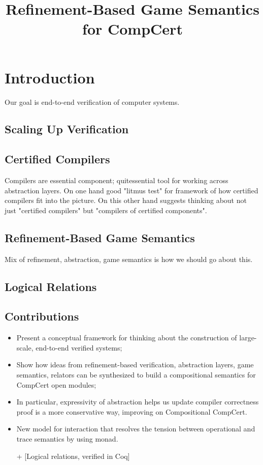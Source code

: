 \documentclass{article}
\title{Refinement-Based Game Semantics for CompCert}
\begin{document}
\maketitle

\section{Introduction} %

Our goal is end-to-end verification of computer systems.

\subsection{Scaling Up Verification} %


\subsection{Certified Compilers} %

Compilers are essential component;
quitessential tool for working across abstraction layers.
On one hand good "litmus test" for framework
of how certified compilers fit into the picture.
On this other hand suggests thinking about not just
"certified compilers" but "compilers of certified components".


\subsection{Refinement-Based Game Semantics} %

Mix of refinement, abstraction, game semantics
is how we should go about this.


\subsection{Logical Relations} %


\subsection{Contributions} %

\begin{itemize}
\item Present a conceptual framework for thinking about
  the construction of large-scale, end-to-end verified systems;
\item Show how ideas from refinement-based verification,
  abstraction layers, game semantics, relators
  can be synthesized
  to build a compositional semantics for CompCert open modules;
\item In particular, expressivity of abstraction helps us
  update compiler correctness proof
  is a more conservative way,
  improving on Compositional CompCert.
\item New model for interaction that resolves the tension between
  operational and trace semantics
  by using monad.
\item[+] [Logical relations, verified in Coq]
\end{itemize}
\end{document}
